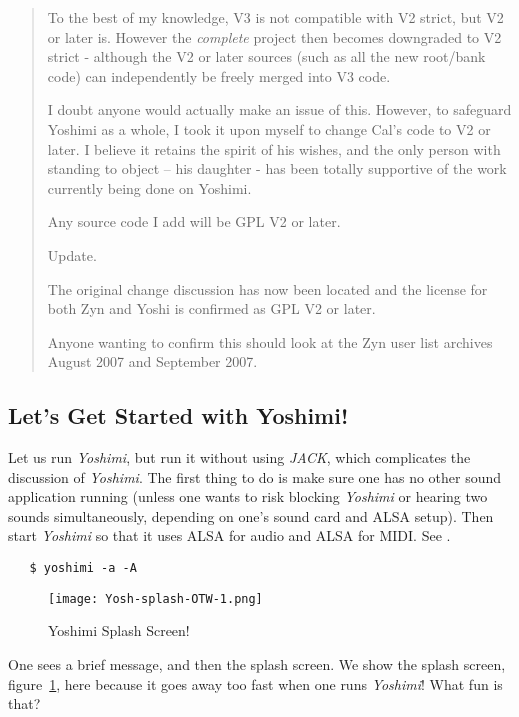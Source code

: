 \documentclass[
 11pt,
 twoside,
 a4paper,
 final                                 %
]{article}
\begin{document}
\begin{quotation}
      To the best of my knowledge, V3 is not compatible with V2 strict, but V2
      or later is. However the \textsl{complete}
      project then becomes downgraded to V2
      strict - although the V2 or later sources (such as all the new root/bank
      code) can independently be freely merged into V3 code.

      I doubt anyone would actually make an issue of this. However, to safeguard
      Yoshimi as a whole, I took it upon myself to change Cal's code to V2 or
      later. I believe it retains the spirit of his wishes, and the only person
      with standing to object -- his daughter - has been totally supportive of
      the work currently being done on Yoshimi.

      Any source code I add will be GPL V2 or later.

      Update.

      The original change discussion has now been located and the license for
      both Zyn and Yoshi is confirmed as GPL V2 or later.

      Anyone wanting to confirm this should look at the Zyn user list archives
      August 2007 and September 2007.
   \end{quotation}

\subsection{Let's Get Started with Yoshimi!}
\label{subsec:introduction_lets_get_started}

   Let us run \textsl{Yoshimi}, but run it without using \textsl{JACK}, which
   complicates the discussion of \textsl{Yoshimi}.  The first
   thing to do is make sure one has no other sound application running
   (unless one wants to risk blocking \textsl{Yoshimi} or hearing two sounds
   simultaneously, depending on one's sound card and ALSA setup).
   Then start \textsl{Yoshimi} so that it uses ALSA for audio and ALSA for
   MIDI.  See .

\begin{verbatim}
   $ yoshimi -a -A
\end{verbatim}

\begin{figure}[H]
   \centering 
   \texttt{[image: Yosh-splash-OTW-1.png]}
   \caption{Yoshimi Splash Screen!}
   \label{fig:yoshimi_splash_screen}
\end{figure}

   One sees a brief message, and then the splash screen.
   We show the splash screen, figure~\ref{fig:yoshimi_splash_screen},
   here because it goes away too fast when one runs \textsl{Yoshimi}!
   What fun is that?
\end{document}
